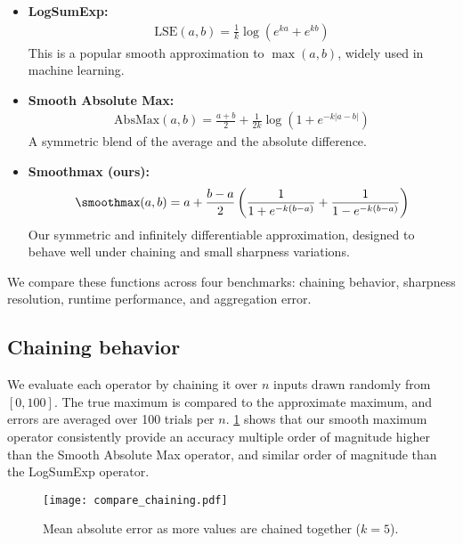 \begin{itemize}
    \item \textbf{LogSumExp:}
    \begin{align}
        \mathrm{LSE}(a, b) = \frac{1}{k} \log\left(e^{k a} + e^{k b}\right)
    \end{align}
    This is a popular smooth approximation to $\max(a, b)$, widely used in machine learning.

    \item \textbf{Smooth Absolute Max:}
    \begin{align}
        \mathrm{AbsMax}(a, b) = \frac{a + b}{2} + \frac{1}{2k} \log\left(1 + e^{-k|a - b|}\right)
    \end{align}
    A symmetric blend of the average and the absolute difference.

    \item \textbf{Smoothmax (ours):}
    \begin{align}
        \smoothmax(a, b) = a + \frac{b - a}{2} \left( \frac{1}{1 + e^{-k(b - a)}} + \frac{1}{1 - e^{-k(b - a)}} \right)
    \end{align}
    Our symmetric and infinitely differentiable approximation, designed to behave well under chaining and small sharpness variations.
\end{itemize}

We compare these functions across four benchmarks: chaining behavior, sharpness resolution, runtime performance, and aggregation error.

\subsection*{Chaining behavior}

We evaluate each operator by chaining it over $n$ inputs drawn randomly from $[0, 100]$. The true maximum is compared to the approximate maximum, and errors are averaged over 100 trials per $n$. \cref{fig:smoothmax-chained-error} shows that our smooth maximum operator consistently provide an accuracy multiple order of magnitude higher than the Smooth Absolute Max operator, and similar order of magnitude than the LogSumExp operator. 

\begin{figure}
    \centering
    \texttt{[image: compare\_chaining.pdf]}
    \caption{Mean absolute error as more values are chained together ($k = 5$).}
    \label{fig:smoothmax-chained-error}
\end{figure}

